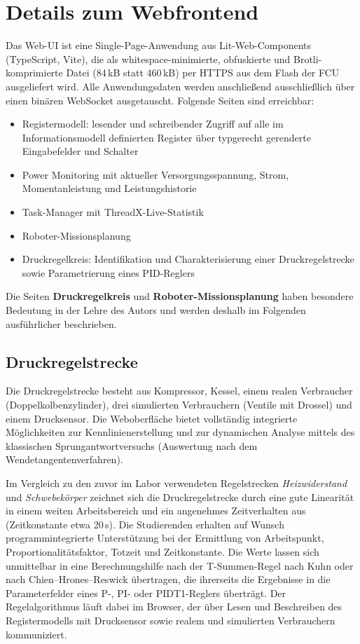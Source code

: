 \documentclass[]{article}%
\begin{document}
\section{Details zum Webfrontend}
Das Web-UI ist eine Single-Page-Anwendung aus Lit-Web-Components (TypeScript, Vite), die als whitespace-minimierte, obfuskierte und Brotli-komprimierte Datei (84\,kB statt 460\,kB) per HTTPS aus dem Flash der FCU ausgeliefert wird. Alle Anwendungsdaten werden anschließend ausschließlich über einen binären WebSocket ausgetauscht. Folgende Seiten sind erreichbar:
\begin{itemize}
\item Registermodell: lesender und schreibender Zugriff auf alle im Informationsmodell definierten Register über typgerecht gerenderte Eingabefelder und Schalter
\item Power Monitoring mit aktueller Versorgungsspannung, Strom, Momentanleistung und Leistungshistorie
\item Task-Manager mit ThreadX-Live-Statistik
\item Roboter-Missionsplanung
\item Druckregelkreis: Identifikation und Charakterisierung einer Druckregelstrecke sowie Parametrierung eines PID-Reglers
\end{itemize}

Die Seiten \textbf{Druckregelkreis} und \textbf{Roboter-Missionsplanung} haben besondere Bedeutung in der Lehre des Autors und werden deshalb im Folgenden ausführlicher beschrieben.

\subsection{Druckregelstrecke}
Die Druckregelstrecke besteht aus Kompressor, Kessel, einem realen Verbraucher (Doppelkolbenzylinder), drei simulierten Verbrauchern (Ventile mit Drossel) und einem Drucksensor. Die Weboberfläche bietet vollständig integrierte Möglichkeiten zur Kennlinienerstellung und zur dynamischen Analyse mittels des klassischen Sprungantwortversuchs (Auswertung nach dem Wendetangentenverfahren).

Im Vergleich zu den zuvor im Labor verwendeten Regelstrecken \emph{Heizwiderstand} und \emph{Schwebekörper} zeichnet sich die Druckregelstrecke durch eine gute Linearität in einem weiten Arbeitsbereich und ein angenehmes Zeitverhalten aus (Zeitkonstante etwa 20\,s). Die Studierenden erhalten auf Wunsch programmintegrierte Unterstützung bei der Ermittlung von Arbeitspunkt, Proportionalitätsfaktor, Totzeit und Zeitkonstante. Die Werte lassen sich unmittelbar in eine Berechnungshilfe nach der T-Summen-Regel nach Kuhn oder nach Chien--Hrones--Reswick \cite{chien1952} übertragen, die ihrerseits die Ergebnisse in die Parameterfelder eines P-, PI- oder PIDT1-Reglers überträgt. Der Regelalgorithmus läuft dabei im Browser, der über Lesen und Beschreiben des Registermodells mit Drucksensor sowie realem und simulierten Verbrauchern kommuniziert.
\end{document}
